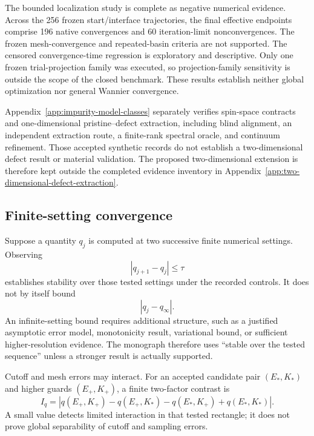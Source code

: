 The bounded localization study is complete as negative numerical evidence.
Across the 256 frozen start/interface trajectories, the final effective
endpoints comprise 196 native convergences and 60 iteration-limit
nonconvergences. The frozen mesh-convergence and repeated-basin criteria are
not supported. The censored convergence-time regression is exploratory and
descriptive. Only one frozen trial-projection family was executed, so
projection-family sensitivity is outside the scope of the closed benchmark.
These results establish neither global optimization nor general Wannier
convergence.

Appendix~\ref{app:impurity-model-classes} separately verifies spin-space
contracts and one-dimensional pristine--defect extraction, including blind
alignment, an independent extraction route, a finite-rank spectral oracle, and
continuum refinement. Those accepted synthetic records do not establish a
two-dimensional defect result or material validation. The proposed
two-dimensional extension is therefore kept outside the completed evidence
inventory in Appendix~\ref{app:two-dimensional-defect-extraction}.

\subsection{Finite-setting convergence}


Suppose a quantity $q_j$ is computed at two successive finite numerical
settings. Observing
\begin{equation}
  |q_{j+1}-q_j|\leq\tau
\end{equation}
establishes stability over those tested settings under the recorded controls. It
does not by itself bound
\begin{equation}
  |q_j-q_{\infty}|.
\end{equation}
An infinite-setting bound requires additional structure, such as a justified
asymptotic error model, monotonicity result, variational bound, or sufficient
higher-resolution evidence. The monograph therefore uses ``stable over the
tested sequence'' unless a stronger result is actually supported.

Cutoff and mesh errors may interact. For an accepted candidate pair
$(E_{\ast},K_{\ast})$ and higher guards $(E_{+},K_{+})$, a finite two-factor
contrast is
\begin{equation}
  I_q=
  \left|
    q(E_{+},K_{+})-q(E_{+},K_{\ast})
    -q(E_{\ast},K_{+})+q(E_{\ast},K_{\ast})
  \right|.
\end{equation}
A small value detects limited interaction in that tested rectangle; it does not
prove global separability of cutoff and sampling errors.

